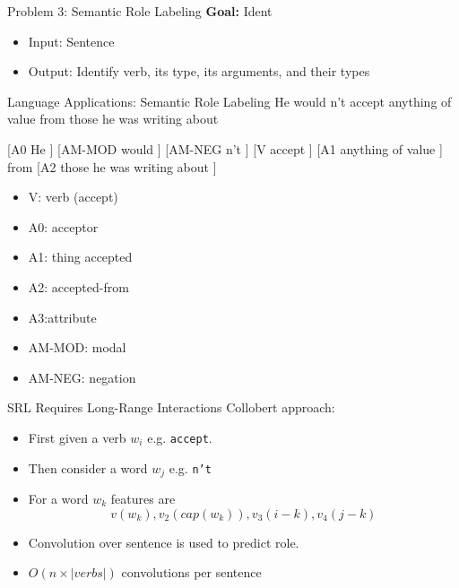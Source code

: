 \documentclass{beamer}
\begin{document}

\begin{frame}{Problem 3: Semantic Role Labeling}
  \textbf{Goal:} Ident
  \begin{itemize}
  \item Input: Sentence
  \item Output: Identify verb, its type, its arguments, and their types
  \end{itemize}
\end{frame}

\begin{frame}{Language Applications: Semantic Role Labeling }
 He  would  n't accept anything of value from those he was writing about  

 \air 

 [A0 He ] [AM-MOD would ] [AM-NEG n't ] [V accept ] [A1 anything of value ] from [A2 those he was writing about ] 

 \begin{itemize}
 \item V: verb (accept)
 \item A0: acceptor 
 \item A1: thing accepted 
 \item A2: accepted-from 
 \item A3:attribute 
 \item AM-MOD: modal 
 \item  AM-NEG: negation
 \end{itemize}
\end{frame}

\begin{frame}{SRL Requires Long-Range Interactions}
  Collobert approach:
  \begin{itemize}
  \item   First given a verb $w_i$ e.g. \texttt{accept}.
    \air 
  \item  Then consider a word $w_j$ e.g. \texttt{n't}
    \air
  \item  For a word $w_k$ features are 
    \[v(w_k), v_2(cap(w_k)), v_3(i-k), v_4(j-k)\]

    \air
  \item Convolution over sentence is used to predict role.
    \air 
  \item $O(n \times |verbs|)$ convolutions per sentence
  \end{itemize}
\end{frame}
\end{document}
